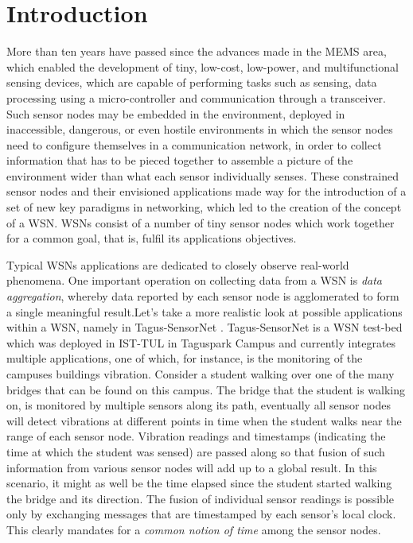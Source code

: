 \chapter{Introduction}

More than ten years have passed since the advances made in the \ac{MEMS} area, which enabled the development of tiny, low-cost, low-power, and multifunctional sensing devices, which are capable of performing tasks such as sensing, data processing using a micro-controller and communication through a transceiver. Such sensor nodes may be embedded in the environment, deployed in inaccessible, dangerous, or even hostile environments in which the sensor nodes need to configure themselves in a communication network, in order to collect information that has to be pieced together to assemble a picture of the environment wider than what each sensor individually senses. These constrained sensor nodes and their envisioned applications made way for the introduction of a set of new key paradigms in networking, which led to the 
creation of the concept of a \ac{WSN}. WSNs consist of a number of tiny sensor nodes which work together for a common goal, that is, fulfil its applications objectives.

Typical WSNs applications are dedicated to closely observe real-world phenomena. One important operation on collecting 
data from a WSN is \textit{data aggregation}, whereby data reported by each sensor node is agglomerated to form a single meaningful result.Let's take a more realistic look at possible applications within a WSN, namely in Tagus-SensorNet \cite{conf/icccn/PedrosaMRN08}. Tagus-SensorNet is a WSN test-bed which was deployed in IST-TUL in Taguspark Campus and currently integrates multiple applications, one of which, for instance, is the monitoring of the campuses buildings vibration. Consider a student walking over one of the many bridges that can be found on this campus. The bridge that the student is walking on, is monitored by multiple sensors along its path, eventually all sensor nodes will detect vibrations at different points in time when the student walks near the range of each sensor node. Vibration readings and timestamps (indicating the time at which the student was sensed) are passed along so that fusion of such information from various sensor nodes will add up to  a global result. In this scenario, it might as well be the time elapsed since the student started walking the bridge and its direction. The fusion of individual sensor readings is possible only 
by exchanging messages that are timestamped by each sensor's local clock. This clearly mandates for a \textit{common notion of time} among the sensor nodes.

